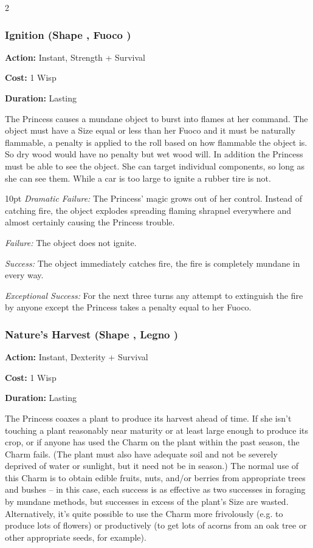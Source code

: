 \begin{multicols}{2}
\subsubsection*{Ignition (Shape \textbullet, Fuoco \textbullet)}

\noindent \textbf{Action:} Instant, Strength + Survival

\noindent \textbf{Cost:} 1 Wisp

\noindent \textbf{Duration:} Lasting

The Princess causes a mundane object to burst into flames at her command. The object must have a Size equal or less than her Fuoco and it must be naturally flammable, a penalty is applied to the roll based on how flammable the object is. So dry wood would have no penalty but wet wood will. In addition the Princess must be able to see the object. She can target individual components, so long as she can see them. While a car is too large to ignite a rubber tire is not.  

\begin{myindentpar}{10pt}    \emph{Dramatic Failure:} The Princess' magic grows out of her control. Instead of catching fire, the object explodes spreading flaming shrapnel everywhere and almost certainly causing the Princess trouble. 

    \emph{Failure:} The object does not ignite. 

    \emph{Success:} The object immediately catches fire, the fire is completely mundane in every way. 

    \emph{Exceptional Success:} For the next three turns any attempt to extinguish the fire by anyone except the Princess takes a penalty equal to her Fuoco.\end{myindentpar}

\subsubsection*{Nature's Harvest (Shape \textbullet, Legno \textbullet)}

\noindent \textbf{Action:} Instant, Dexterity + Survival 

\noindent \textbf{Cost:} 1 Wisp

\noindent \textbf{Duration:} Lasting 

The Princess coaxes a plant to produce its harvest ahead of time. If she isn't touching a plant reasonably near maturity or at least large enough to produce its crop, or if anyone has used the Charm on the plant within the past season, the Charm fails. (The plant must also have adequate soil and not be severely deprived of water or sunlight, but it need not be in season.) The normal use of this Charm is to obtain edible fruits, nuts, and/or berries from appropriate trees and bushes -- in this case, each success is as effective as two successes in foraging by mundane methods, but successes in excess of the plant's Size are wasted. Alternatively, it's quite possible to use the Charm more frivolously (e.g. to produce lots of flowers) or productively (to get lots of acorns from an oak tree or other appropriate seeds, for example).


\end{multicols}
